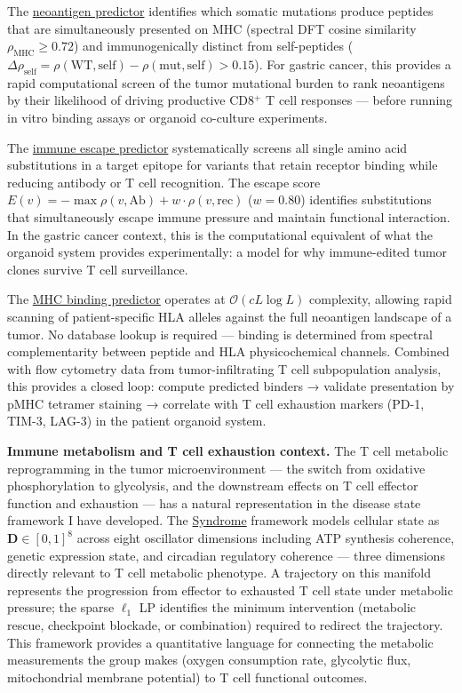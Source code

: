 \documentclass[12pt,a4paper]{article}
\begin{document}
The \href{https://syndrome-seven.vercel.app/tools/neoantigen}{neoantigen predictor}
identifies which somatic mutations produce peptides that are simultaneously
presented on MHC (spectral DFT cosine similarity $\rho_{\mathrm{MHC}} \geq 0.72$)
and immunogenically distinct from self-peptides
($\Delta\rho_{\mathrm{self}} = \rho(\mathrm{WT,self}) - \rho(\mathrm{mut,self}) > 0.15$).
For gastric cancer, this provides a rapid computational screen of the tumor
mutational burden to rank neoantigens by their likelihood of driving productive
CD8$^+$ T cell responses --- before running in vitro binding assays or
organoid co-culture experiments.

The \href{https://syndrome-seven.vercel.app/tools/escape-predictor}{immune escape predictor}
systematically screens all single amino acid substitutions in a target epitope
for variants that retain receptor binding while reducing antibody or T cell
recognition. The escape score $E(v) = -\max\rho(v, \mathrm{Ab}) + w\cdot\rho(v, \mathrm{rec})$
($w=0.80$) identifies substitutions that simultaneously escape immune pressure
and maintain functional interaction. In the gastric cancer context, this is the
computational equivalent of what the organoid system provides experimentally:
a model for why immune-edited tumor clones survive T cell surveillance.

The \href{https://syndrome-seven.vercel.app/tools/mhc-binding}{MHC binding predictor}
operates at $\mathcal{O}(cL\log L)$ complexity, allowing rapid scanning of
patient-specific HLA alleles against the full neoantigen landscape of a tumor.
No database lookup is required --- binding is determined from spectral
complementarity between peptide and HLA physicochemical channels.
Combined with flow cytometry data from tumor-infiltrating T cell subpopulation
analysis, this provides a closed loop: compute predicted binders → validate
presentation by pMHC tetramer staining → correlate with T cell exhaustion
markers (PD-1, TIM-3, LAG-3) in the patient organoid system.

\textbf{Immune metabolism and T cell exhaustion context.}
The T cell metabolic reprogramming in the tumor microenvironment --- the switch
from oxidative phosphorylation to glycolysis, and the downstream effects on
T cell effector function and exhaustion --- has a natural representation in the
disease state framework I have developed.
The \href{https://github.com/fullscreen-triangle/syndrome}{Syndrome} framework
models cellular state as $\mathbf{D}\in[0,1]^8$ across eight oscillator
dimensions including ATP synthesis coherence, genetic expression state, and
circadian regulatory coherence --- three dimensions directly relevant to
T cell metabolic phenotype.
A trajectory on this manifold represents the progression from effector to
exhausted T cell state under metabolic pressure; the sparse $\ell_1$ LP
identifies the minimum intervention (metabolic rescue, checkpoint blockade,
or combination) required to redirect the trajectory.
This framework provides a quantitative language for connecting the metabolic
measurements the group makes (oxygen consumption rate, glycolytic flux,
mitochondrial membrane potential) to T cell functional outcomes.
\end{document}

